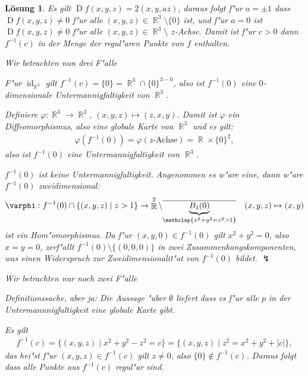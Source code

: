 \documentclass[paper=A4, twoside, chapterprefix=true, bibliography=totoc, headsepline]{scrbook}
\let\temp\phi
\let\phi\varphi
\let\varphi\temp
\let\temp\theta
\let\theta\vartheta
\let\vartheta\temp
\let\temp\epsilon
\let\epsilon\varepsilon
\let\varepsilon\temp
\let\temp\rho
\let\rho\varrho
\let\varrho\temp
\DeclareMathOperator{\R}{\mathbb{R}}
\DeclareMathOperator{\id}{id} %
\DeclareMathOperator{\D}{D} %
\newcommand{\X}{\times}
\theoremstyle{plain}
\theoremstyle{nonumberplain}
\theoremstyle{empty}
\theoremstyle{break}
\newtheorem{Loes}{L\"osung}
\begin{document}
\begin{Loes}
Es gilt $\D f (x, y, z) = 2(x, y, az)$, daraus folgt f"ur $a = \pm 1 $ dass $\D f(x, y, z) \ne 0$ f"ur alle $(x, y, z) \in \R^3 \setminus \{0\}$ ist, und f"ur $a = 0$ ist $\D f(x, y, z) \ne 0$ f"ur alle $(x, y, z) \in \R^3 \setminus$ $z$-Achse.
Damit ist f"ur $c > 0$ dann $f^{-1}(c)$ in der Menge der regul"aren Punkte von $f$ enthalten.
\begin{description}[leftmargin=*]
\item[F"ur $\bm{c = 0}$:]
	Wir betrachten nun drei F"alle
	\begin{description}[font=\normalfont]
	\item[$a = 1$:]
		F"ur $\id_{\R^3}$ gilt $f^{-1}(c) = \{0\} = \R^3 \cap \{0\}^{3-0}$, also ist $f^{-1}(0)$ eine $0$-dimensionale Untermannigfaltigkeit von $\R^3$.
	\item[$a = 0$:]
		Definiere $\phi: \R^3 \to \R^3$, $(x, y, z) \mapsto (z, x, y)$.
		Damit ist $\phi$ ein Diffeomorphismus, also eine globale Karte von $\R^3$ und es gilt:
		\begin{align*}
			\phi(f^{-1}(0)) = \phi(z \text{-Achse}) = \R \X \{0\}^2,
		\end{align*}
		also ist $f^{-1}(0)$ eine Untermannigfaltigkeit von $\R^3$.
	\item[$a = -1$:]
		$f^{-1}(0)$ ist keine Untermannigfaltigkeit. Angenommen es w"are eine, dann w"are $f^{-1}(0)$ zweidimensional:
		\begin{align*}
			\phi: f^{-1}(0) \cap \{(x, y, z) \mid z > 1 \} \to \R^2 \setminus \overline{\underbrace{B_1(0)}_{\mathclap{x^2 + y^2 = z^2 > 1}}} &&
			(x, y, z) \mapsto (x, y)
		\end{align*}
		ist ein Hom"omorphismus.
		Da f"ur $(x, y, 0) \in f^{-1}(0)$ gilt $x^2 + y^2 = 0$, also $x = y = 0$, zerf"allt $f^{-1}(0) \setminus \{(0,0,0)\}$ in zwei Zusammenhangskomponenten, was einen Widerspruch zur Zweidimensionalit"at von $f^{-1}(0)$ bildet. $\lightning$
	\end{description}
\item[F"ur $\bm{c < 0}$:]
	Wir betrachten nur noch zwei F"alle
	\begin{description}[font=\normalfont]
	\item[$a = 1, 0$:]
		Definitionssache, aber ja: Die Aussage "uber $\emptyset$ liefert dass es f"ur alle $p$ in der Untermannnigfaltigkeit eine globale Karte gibt.
	\item[$a = -1$:]
		Es gilt
		\begin{align*}
			f^{-1}(c) = \{ (x,y,z) \mid x^2 + y^2 - z^2 = c \} = \{ (x,y,z) \mid z^2 = x^2 + y^2 + |c| \},
		\end{align*}
		das hei"st f"ur $(x, y, z) \in f^{-1}(c)$ gilt $z \ne 0$, also $\{0\} \notin f^{-1}(c)$.
		Daraus folgt dass alle Punkte aus $f^{-1}(c)$ regul"ar sind.
	\end{description}
\end{description}
\end{Loes}
\end{document}
